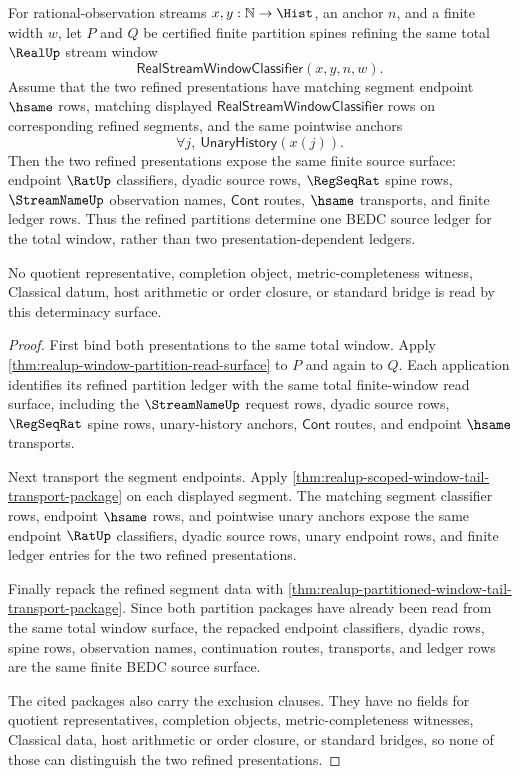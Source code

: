 \begin{theorem}
\label{thm:realup-refined-partition-tail-source-determinacy}
For rational-observation streams $x,y:\mathbb{N}\to\Hist$, an anchor $n$, and
a finite width $w$, let $P$ and $Q$ be certified finite partition spines
refining the same total $\RealUp$ stream window
$$
\mathsf{RealStreamWindowClassifier}(x,y,n,w).
$$
Assume that the two refined presentations have matching segment endpoint
$\hsame$ rows, matching displayed
$\mathsf{RealStreamWindowClassifier}$ rows on corresponding refined segments,
and the same pointwise anchors
$$
\forall j,\ \mathsf{UnaryHistory}(x(j)).
$$
Then the two refined presentations expose the same finite source surface:
endpoint $\RatUp$ classifiers, dyadic source rows, $\RegSeqRat$ spine rows,
$\StreamNameUp$ observation names, $\mathsf{Cont}$ routes, $\hsame$ transports,
and finite ledger rows. Thus the refined partitions determine one BEDC source
ledger for the total window, rather than two presentation-dependent ledgers.

No quotient representative, completion object, metric-completeness witness,
Classical datum, host arithmetic or order closure, or standard bridge is read
by this determinacy surface.
\end{theorem}
\begin{proof}
First bind both presentations to the same total window. Apply
\autoref{thm:realup-window-partition-read-surface} to $P$ and again to $Q$.
Each application identifies its refined partition ledger with the same total
finite-window read surface, including the $\StreamNameUp$ request rows,
dyadic source rows, $\RegSeqRat$ spine rows, unary-history anchors,
$\mathsf{Cont}$ routes, and endpoint $\hsame$ transports.

Next transport the segment endpoints. Apply
\autoref{thm:realup-scoped-window-tail-transport-package} on each displayed
segment. The matching segment classifier rows, endpoint $\hsame$ rows, and
pointwise unary anchors expose the same endpoint $\RatUp$ classifiers, dyadic
source rows, unary endpoint rows, and finite ledger entries for the two refined
presentations.

Finally repack the refined segment data with
\autoref{thm:realup-partitioned-window-tail-transport-package}. Since both
partition packages have already been read from the same total window surface,
the repacked endpoint classifiers, dyadic rows, spine rows, observation names,
continuation routes, transports, and ledger rows are the same finite BEDC
source surface.

The cited packages also carry the exclusion clauses. They have no fields for
quotient representatives, completion objects, metric-completeness witnesses,
Classical data, host arithmetic or order closure, or standard bridges, so none
of those can distinguish the two refined presentations.
\end{proof}

